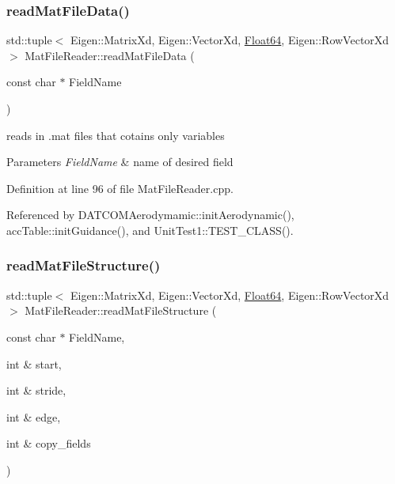 \subsubsection{\texorpdfstring{read\+Mat\+File\+Data()}{readMatFileData()}}
{\footnotesize\ttfamily std\+::tuple$<$ Eigen\+::\+Matrix\+Xd, Eigen\+::\+Vector\+Xd, \hyperlink{group___tools_ga3f1431cb9f76da10f59246d1d743dc2c}{Float64}, Eigen\+::\+Row\+Vector\+Xd $>$ Mat\+File\+Reader\+::read\+Mat\+File\+Data (\begin{DoxyParamCaption}\item[{const char $\ast$}]{Field\+Name }\end{DoxyParamCaption})}



reads in .mat files that cotains only variables 


\begin{DoxyParams}{Parameters}
{\em Field\+Name} & name of desired field \\
\hline
\end{DoxyParams}


Definition at line 96 of file Mat\+File\+Reader.\+cpp.



Referenced by D\+A\+T\+C\+O\+M\+Aerodymamic\+::init\+Aerodynamic(), acc\+Table\+::init\+Guidance(), and Unit\+Test1\+::\+T\+E\+S\+T\+\_\+\+C\+L\+A\+S\+S().

\mbox{\label{class_mat_file_reader_a348e33866c02d6bfe3be63ad34871025}} 
\subsubsection{\texorpdfstring{read\+Mat\+File\+Structure()}{readMatFileStructure()}}
{\footnotesize\ttfamily std\+::tuple$<$ Eigen\+::\+Matrix\+Xd, Eigen\+::\+Vector\+Xd, \hyperlink{group___tools_ga3f1431cb9f76da10f59246d1d743dc2c}{Float64}, Eigen\+::\+Row\+Vector\+Xd $>$ Mat\+File\+Reader\+::read\+Mat\+File\+Structure (\begin{DoxyParamCaption}\item[{const char $\ast$}]{Field\+Name,  }\item[{int \&}]{start,  }\item[{int \&}]{stride,  }\item[{int \&}]{edge,  }\item[{int \&}]{copy\+\_\+fields }\end{DoxyParamCaption})}



